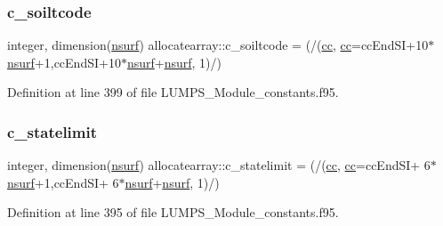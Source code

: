 \mbox{\label{namespaceallocatearray_acb3f02c069d894cd2ddc73a5e4f0b1b5}} 
\subsubsection{\texorpdfstring{c\+\_\+soiltcode}{c\_soiltcode}}
{\footnotesize\ttfamily integer, dimension(\hyperlink{namespaceallocatearray_acd22f92a06f7e9a2a91426b3dc99fdb0}{nsurf}) allocatearray\+::c\+\_\+soiltcode = (/(\hyperlink{namespaceallocatearray_ac863c81704eb507dee10f5e10741e10c}{cc}, \hyperlink{namespaceallocatearray_ac863c81704eb507dee10f5e10741e10c}{cc}=cc\+End\+SI+10$\ast$\hyperlink{namespaceallocatearray_acd22f92a06f7e9a2a91426b3dc99fdb0}{nsurf}+1,cc\+End\+SI+10$\ast$\hyperlink{namespaceallocatearray_acd22f92a06f7e9a2a91426b3dc99fdb0}{nsurf}+\hyperlink{namespaceallocatearray_acd22f92a06f7e9a2a91426b3dc99fdb0}{nsurf}, 1)/)}



Definition at line 399 of file L\+U\+M\+P\+S\+\_\+\+Module\+\_\+constants.\+f95.

\mbox{\label{namespaceallocatearray_a3b5275837de2a17f3a3529a9a5a38434}} 
\subsubsection{\texorpdfstring{c\+\_\+statelimit}{c\_statelimit}}
{\footnotesize\ttfamily integer, dimension(\hyperlink{namespaceallocatearray_acd22f92a06f7e9a2a91426b3dc99fdb0}{nsurf}) allocatearray\+::c\+\_\+statelimit = (/(\hyperlink{namespaceallocatearray_ac863c81704eb507dee10f5e10741e10c}{cc}, \hyperlink{namespaceallocatearray_ac863c81704eb507dee10f5e10741e10c}{cc}=cc\+End\+SI+ 6$\ast$\hyperlink{namespaceallocatearray_acd22f92a06f7e9a2a91426b3dc99fdb0}{nsurf}+1,cc\+End\+SI+ 6$\ast$\hyperlink{namespaceallocatearray_acd22f92a06f7e9a2a91426b3dc99fdb0}{nsurf}+\hyperlink{namespaceallocatearray_acd22f92a06f7e9a2a91426b3dc99fdb0}{nsurf}, 1)/)}



Definition at line 395 of file L\+U\+M\+P\+S\+\_\+\+Module\+\_\+constants.\+f95.

